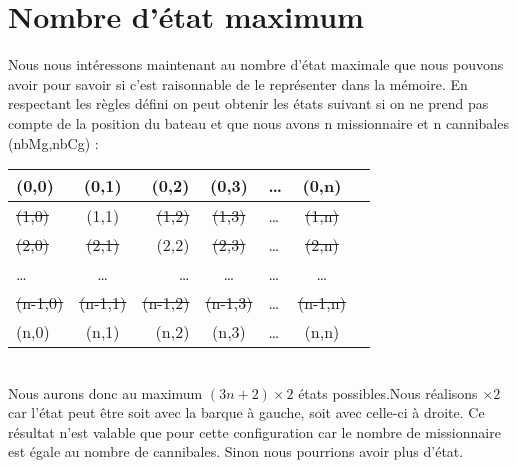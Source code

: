 \documentclass[a4paper, 12pt, french,oneside]{book}
\begin{document}
\section{Nombre d'état maximum}
Nous nous intéressons maintenant au nombre d'état maximale que nous pouvons avoir pour savoir si c'est raisonnable de le représenter dans la mémoire. En respectant les règles défini on peut obtenir les états suivant si on ne prend pas compte de la position du bateau et que nous avons n missionnaire et n cannibales (nbMg,nbCg) : \\
\begin{tabular}{|l|c|r|c|l|c|r|}
    \hline
    (0,0)          & (0,1) & (0,2)          & (0,3) & \dots & (0,n) \\
    \hline
    \sout{(1,0)}   &
    (1,1)          &
    \sout{(1,2)}   &
    \sout{(1,3)}   & \dots &
    \sout{(1,n)}                                                    \\
    \hline
    \sout{(2,0)}   &
    \sout{(2,1)}   &
    (2,2)          &
    \sout{(2,3)}   & \dots &
    \sout{(2,n)}                                                    \\
    \hline
    \dots          & \dots & \dots          & \dots & \dots & \dots \\
    \hline
    \sout{(n-1,0)} &
    \sout{(n-1,1)} &
    \sout{(n-1,2)} &
    \sout{(n-1,3)} & \dots & \sout{(n-1,n)}                         \\
    \hline
    (n,0)          &
    (n,1)          &
    (n,2)          &
    (n,3)          & \dots & (n,n)                                  \\
    \hline
\end{tabular} \\
Nous aurons donc au maximum $(3n+2)\times2$ états possibles.Nous réalisons $\times 2$ car l'état peut être soit avec la barque à gauche, soit avec celle-ci à droite. Ce résultat n'est valable que pour cette configuration car le nombre de missionnaire est égale au nombre de cannibales. Sinon nous pourrions avoir plus d'état.
\end{document}
